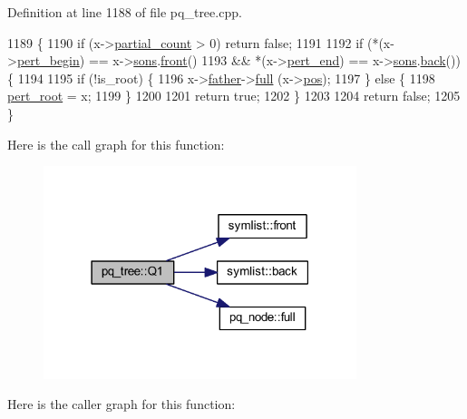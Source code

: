 Definition at line 1188 of file pq\+\_\+tree.\+cpp.


\begin{DoxyCode}
1189 \{
1190     \textcolor{keywordflow}{if} (x->\mbox{\hyperlink{classq__node_a7ba602eae7be6811ac965bf95521a513}{partial\_count}} > 0) \textcolor{keywordflow}{return} \textcolor{keyword}{false};
1191     
1192     \textcolor{keywordflow}{if} (*(x->\mbox{\hyperlink{classq__node_ac636443853e4074a0e6c441d7bcb249a}{pert\_begin}}) == x->\mbox{\hyperlink{classpq__node_a2cc030cfa4560872acea8b50ebd0542b}{sons}}.\mbox{\hyperlink{classsymlist_afd4b55616fc20033d4a47684551866e8}{front}}() 
1193     && *(x->\mbox{\hyperlink{classq__node_a7a331cc1f5d9f7b4b77b7b25b4976c3b}{pert\_end}}) == x->\mbox{\hyperlink{classpq__node_a2cc030cfa4560872acea8b50ebd0542b}{sons}}.\mbox{\hyperlink{classsymlist_abc0570ff78ded9210ac26865519d36e3}{back}}()) \{
1194     
1195     \textcolor{keywordflow}{if} (!is\_root) \{
1196         x->\mbox{\hyperlink{classpq__node_a3e7c886498c76c633f057fb42ff9c435}{father}}->\mbox{\hyperlink{classpq__node_af1ba861293e4493dba7cc2c9332fee76}{full}} (x->\mbox{\hyperlink{classpq__node_a5e8a5defa0fec4ff2e82fabee97296b4}{pos}});
1197     \} \textcolor{keywordflow}{else} \{
1198         \mbox{\hyperlink{classpq__tree_adf0d16ca5a29bfbe863efb525135ac01}{pert\_root}} = x;
1199     \}
1200     
1201     \textcolor{keywordflow}{return} \textcolor{keyword}{true};
1202     \} 
1203     
1204     \textcolor{keywordflow}{return} \textcolor{keyword}{false};
1205 \}
\end{DoxyCode}
Here is the call graph for this function\+:\nopagebreak
\begin{figure}[H]
\begin{center}
\leavevmode
\includegraphics[width=259pt]{classpq__tree_ab1c7266de209f9ac9f3267b4d8cafc48_cgraph}
\end{center}
\end{figure}
Here is the caller graph for this function\+:\nopagebreak
